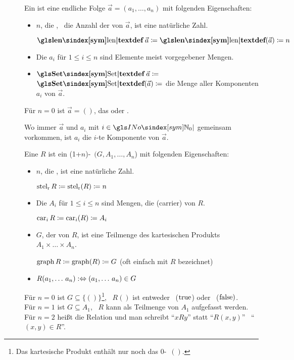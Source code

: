 \begin{description}

	\item [\Tupel] Ein  ist eine endliche Folge $\vec{a} = (a_1, \dots, a_n)$ mit folgenden Eigenschaften:
	\begin{itemize}
		\item $n$, die , \textdh\ die Anzahl der  von $\vec{a}$, ist eine natürliche Zahl.

		$\undefinition{\symlen} \vec{a} \defeq \definition{\symlen}(\vec{a}) \defeq n$
		\item Die $a_i$ für $1 \le i \le n$ sind Elemente meist vorgegebener Mengen.
		\item $\undefinition{\symSet} \vec{a} \defeq$ $\definition{\symSet}(\vec{a}) \defeq$ die Menge aller Komponenten $a_i$ von $\vec{a}$.
	\end{itemize}
	Für $n=0$ ist $\vec{a} = ()$, das  oder .

	Wo immer $\vec{a}$ und $a_i$ mit $i \in \symINo$ gemeinsam vorkommen, ist $a_i$ die $i$-te Komponente von $\vec{a}$.

	\item [\Relation] Eine  $R$ ist ein (1+$n$)-\Tupel\ $(G,A_1,\dots,A_n$) mit folgenden Eigenschaften:
	\begin{itemize}
		\item $n$, die , ist eine natürliche Zahl.

		$\operatorname*{stel_r} R \coloneqq \operatorname*{stel_r}(R) \coloneqq n$
		\item Die $A_i$ für $1 \le i \le n$ sind Mengen, die  (carrier) von $R$.

		$\operatorname*{car}_i R \coloneqq \operatorname*{car}_i(R) \coloneqq A_i$
		\item $G$, der  von $R$, ist eine Teilmenge des kartesischen Produkts $A_1 \times \dots \times A_n$.

		$\operatorname*{graph} R \coloneqq \operatorname*{graph}(R) \coloneqq G$ (oft einfach mit $R$ bezeichnet)
		\item $R(a_1,\dots\,a_n) :\Leftrightarrow (a_1,\dots\,a_n) \in G$
	\end{itemize}
	Für $n=0$ ist $G \subseteq \{()\}$\footnote{Das kartesische Produkt enthält nur noch das $0$-\Tupel\ $()$.}, \textdh\ $R()$ ist entweder \wahr\ ($\mathrm{true}$) oder \falsch\ ($\mathrm{false})$.
	\\Für $n=1$ ist $G \subseteq A_1$, \textdh\ $R$ kann als Teilmenge von $A_1$ aufgefasst werden.
	\\Für $n=2$ heißt die Relation  und man schreibt \enquote{$x R y$} statt \enquote{$R(x,y)$} \textbzw\ \enquote{$(x,y) \in R$}.


\end{description}

